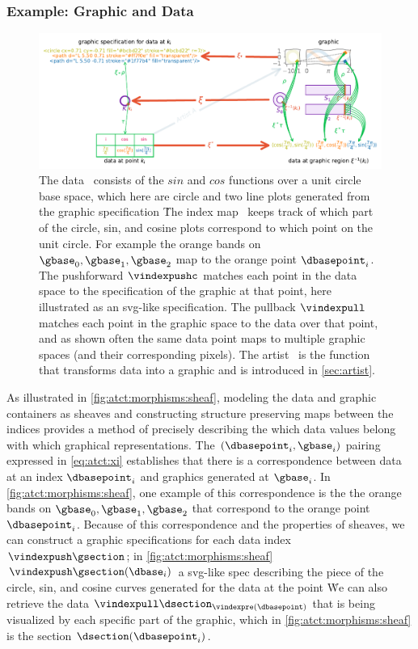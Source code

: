 \documentclass[journal]{IEEEtran}
\theoremstyle{definition}
\theoremstyle{remark}
\begin{document}
\subsubsection{Example: Graphic and Data}
\begin{figure}[t]
  \includegraphics[width=1\textwidth]{xi_diagram.pdf}
  \caption{The data  \dsectionc\ consists of the $sin$ and $cos$ functions over a unit circle base space, which here are circle and two line plots generated from the graphic specification \gsectionc\. The index map \vindexc\ keeps track of which part of the circle, sin, and cosine plots correspond to which point on the unit circle. For example the orange bands on $\gbase_0, \gbase_1, \gbase_2$ map to the orange point $\dbasepoint_i$. The pushforward $\vindexpushc$ matches each point in the data space to the specification of the graphic at that point, here illustrated as an svg-like specification. The pullback $\vindexpull$ matches each point in the graphic space to the data over that point, and as shown often the same data point maps to multiple graphic spaces (and their corresponding pixels). The artist \vartistc\ is the function
  that transforms data into a graphic and is introduced in \autoref{sec:artist}.
  \label{fig:atct:morphisms:sheaf}}
\end{figure}

As illustrated in \autoref{fig:atct:morphisms:sheaf}, modeling the data and graphic containers as sheaves and constructing structure preserving maps between the indices provides a method of precisely describing the which data values belong with which graphical representations. The $(\dbasepoint_i, \gbase_i)$ pairing expressed in \autoref{eq:atct:xi} establishes that there is a correspondence between data at an index $\dbasepoint_i$ and graphics generated at $\gbase_i$. In \autoref{fig:atct:morphisms:sheaf}, one example of this correspondence is the the orange bands on $\gbase_0, \gbase_1, \gbase_2$ that correspond to the orange point $\dbasepoint_i$. Because of this correspondence and the properties of sheaves, we can construct a graphic specifications for each data index $\vindexpush\gsection$; in \autoref{fig:atct:morphisms:sheaf}  $\vindexpush\gsection(\dbase_i)$ a svg-like spec describing the piece of the circle, sin, and cosine curves generated for the data at the point \dbasepointc\. We can also retrieve the data $\vindexpull\dsection_{\vindexpre(\dbasepoint)}$ that is being visualized by each specific part of the graphic, which in \autoref{fig:atct:morphisms:sheaf} is the section $\dsection(\dbasepoint_i)$.
\end{document}
